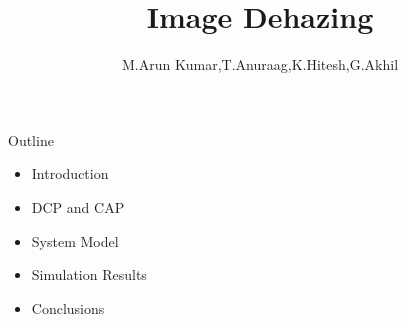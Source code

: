 \documentclass{beamer}
\title[Pilot Contamination\hspace{0.5cm} \insertframenumber/\inserttotalframenumber]{Image Dehazing}
\author{M.Arun Kumar,T.Anuraag,K.Hitesh,G.Akhil}
\institute[IIT Bombay]
\date{ }
\begin{document}
\begin{frame}
	\sffamily %
	\titlepage	
\end{frame}

\begin{frame}[t]{Outline} \vspace*{0.7cm}
	\begin{itemize}
		\item Introduction
		\item DCP and CAP
		\item System Model
		\item Simulation Results 
		\item Conclusions
		
		
	\end{itemize}	
\end{frame}
\end{document}
